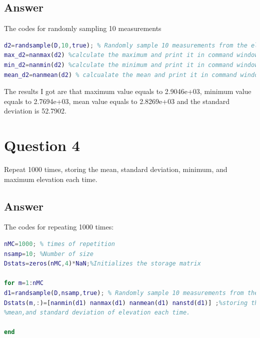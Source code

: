 \documentclass[
	12pt, %
]{fphw}
\begin{document}

\subsection*{Answer} 

The codes for randomly sampling 10 measurements

\begin{lstlisting}[language=Matlab,escapeinside=``]
d2=randsample(D,10,true); % Randomly sample 10 measurements from the elevations
max_d2=nanmax(d2) %calculate the maximum and print it in command window
min_d2=nanmin(d2) %calculate the minimum and print it in command window
mean_d2=nanmean(d2) % calcualate the mean and print it in command window
\end{lstlisting}

The results I got are that maximum value equals to 2.9046e+03, minimum value equals to 2.7694e+03, mean value equals to 2.8269e+03 and the standard deviation is 52.7902.





\section*{Question 4 }

\begin{problem}
Repeat 1000 times, storing the mean, standard deviation, minimum, and maximum elevation each time.
\end{problem}





\subsection*{Answer}

The codes for repeating 1000 times:
\begin{lstlisting}[language=Matlab,escapeinside=``]
nMC=1000; % times of repetition
nsamp=10; %Number of size
Dstats=zeros(nMC,4)*NaN;%Initializes the storage matrix

for m=1:nMC
d1=randsample(D,nsamp,true); % Randomly sample 10 measurements from the elevations
Dstats(m,:)=[nanmin(d1) nanmax(d1) nanmean(d1) nanstd(d1)] ;%storing the minimum, maximum,
%mean,and standard deviation of elevation each time.

end
\end{lstlisting}
\end{document}
